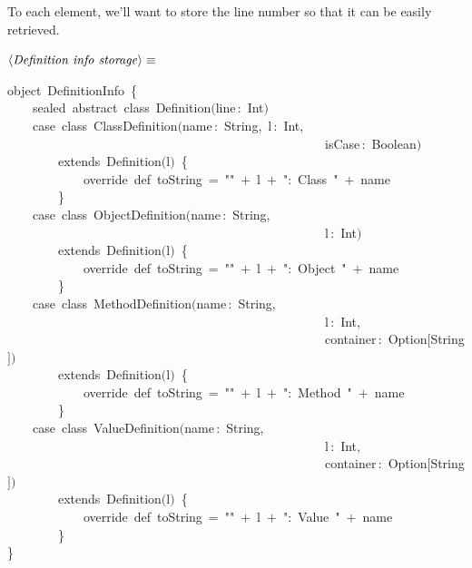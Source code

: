 \documentclass[a4paper,12pt]{article}
\begin{document}
To each element, we'll want to store the line number so that it can be easily
retrieved.

$\left<\mbox{\emph{Definition info storage}}\right>\equiv$
\begin{program}{\vem object}~DefinitionInfo~{\small\{}
\\~~~~{\vem sealed}~{\vem abstract}~{\vem class}~Definition$($line\,{\rm :}~Int$)$
\\[0.5em]~~~~{\vem case}~{\vem class}~ClassDefinition$($name\,{\rm :}~String,~l\,{\rm :}~Int,
\\~~~~~~~~~~~~~~~~~~~~~~~~~~~~~~~~~~~~~~~~~~~~~~~~~~isCase\,{\rm :}~Boolean$)$
\\~~~~~~~~{\vem extends}~Definition$($l$)$~{\small\{}
\\~~~~~~~~~~~~{\vem override}~{\vem def}~toString~=~""~$+$~l~$+$~"{\rm :}~Class~"~$+$~name
\\~~~~~~~~{\small\}}
\\[0.5em]~~~~{\vem case}~{\vem class}~ObjectDefinition$($name\,{\rm :}~String,
\\~~~~~~~~~~~~~~~~~~~~~~~~~~~~~~~~~~~~~~~~~~~~~~~~~~l\,{\rm :}~Int$)$
\\~~~~~~~~{\vem extends}~Definition$($l$)$~{\small\{}
\\~~~~~~~~~~~~{\vem override}~{\vem def}~toString~=~""~$+$~l~$+$~"{\rm :}~Object~"~$+$~name
\\~~~~~~~~{\small\}}
\\[0.5em]~~~~{\vem case}~{\vem class}~MethodDefinition$($name\,{\rm :}~String,
\\~~~~~~~~~~~~~~~~~~~~~~~~~~~~~~~~~~~~~~~~~~~~~~~~~~l\,{\rm :}~Int,
\\~~~~~~~~~~~~~~~~~~~~~~~~~~~~~~~~~~~~~~~~~~~~~~~~~~container\,{\rm :}~Option$[$String$]$$)$
\\~~~~~~~~{\vem extends}~Definition$($l$)$~{\small\{}
\\~~~~~~~~~~~~{\vem override}~{\vem def}~toString~=~""~$+$~l~$+$~"{\rm :}~Method~"~$+$~name
\\~~~~~~~~{\small\}}
\\[0.5em]~~~~{\vem case}~{\vem class}~ValueDefinition$($name\,{\rm :}~String,
\\~~~~~~~~~~~~~~~~~~~~~~~~~~~~~~~~~~~~~~~~~~~~~~~~~~l\,{\rm :}~Int,
\\~~~~~~~~~~~~~~~~~~~~~~~~~~~~~~~~~~~~~~~~~~~~~~~~~~container\,{\rm :}~Option$[$String$]$$)$
\\~~~~~~~~{\vem extends}~Definition$($l$)$~{\small\{}
\\~~~~~~~~~~~~{\vem override}~{\vem def}~toString~=~""~$+$~l~$+$~"{\rm :}~Value~"~$+$~name
\\~~~~~~~~{\small\}}
\\{\small\}}
\\[0.5em]\end{program}
\end{document}
